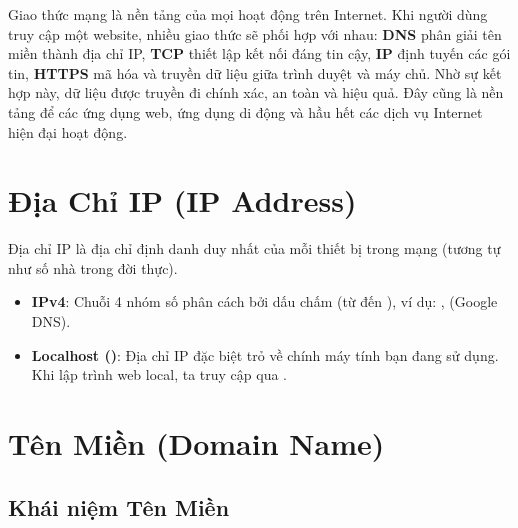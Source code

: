 \begin{noteBox}
Giao thức mạng là nền tảng của mọi hoạt động trên Internet. Khi người dùng truy cập một website, nhiều giao thức sẽ phối hợp với nhau: \textbf{DNS} phân giải tên miền thành địa chỉ IP, \textbf{TCP} thiết lập kết nối đáng tin cậy, \textbf{IP} định tuyến các gói tin, \textbf{HTTPS} mã hóa và truyền dữ liệu giữa trình duyệt và máy chủ. Nhờ sự kết hợp này, dữ liệu được truyền đi chính xác, an toàn và hiệu quả. Đây cũng là nền tảng để các ứng dụng web, ứng dụng di động và hầu hết các dịch vụ Internet hiện đại hoạt động.
\end{noteBox}

\section{Địa Chỉ IP (IP Address)}
\label{sec:ip_address}

Địa chỉ IP là địa chỉ định danh duy nhất của mỗi thiết bị trong mạng (tương tự như số nhà trong đời thực). 

\begin{itemize}[leftmargin=1.8em, itemsep=2pt, parsep=0pt]
    \item \textbf{IPv4}: Chuỗi 4 nhóm số phân cách bởi dấu chấm (từ  đến ), ví dụ: ,  (Google DNS).
    \item \textbf{Localhost ()}: Địa chỉ IP đặc biệt trỏ về chính máy tính bạn đang sử dụng. Khi lập trình web local, ta truy cập qua .
\end{itemize}

\section{Tên Miền (Domain Name)}
\label{sec:domain_name_deep_dive}

\subsection{Khái niệm Tên Miền}

